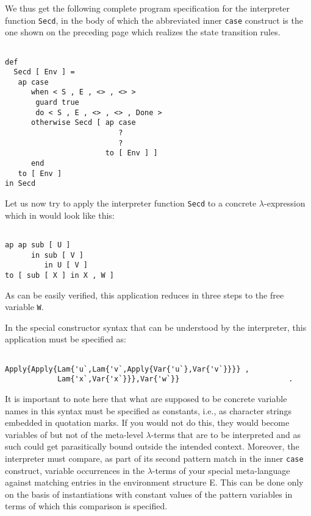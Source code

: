 We thus get the following complete program specification for the
interpreter function  {\tt Secd}, in the body of 
which the abbreviated inner {\tt case} construct is the one
shown on the preceding page which  realizes the state transition rules.
\begin{verbatim}
 
def 
  Secd [ Env ] =
   ap case 
      when < S , E , <> , <> >
       guard true
       do < S , E , <> , <> , Done >
      otherwise Secd [ ap case 
                          ? 
                          ?
                       to [ Env ] ]
      end
   to [ Env ]
in Secd

\end{verbatim}

Let us now try to apply the interpreter function {\tt Secd} to a
concrete $\lambda$-expression which in \kir would look like this:
\begin{verbatim}

ap ap sub [ U ]
      in sub [ V ]
         in U [ V ] 
to [ sub [ X ] in X , W ]

\end{verbatim}
As can be easily verified,
 this application reduces in three steps to the free variable {\tt W}.

In the special constructor syntax that can be understood by the interpreter,
this application must be specified as:
\begin{verbatim}

Apply{Apply{Lam{'u`,Lam{'v`,Apply{Var{'u`},Var{'v`}}}} ,
            Lam{'x`,Var{'x`}}},Var{'w`}}                         .

\end{verbatim}
It is important to note here that what are supposed to be concrete 
variable names in this syntax must be specified as constants, i.e.,
as character strings embedded in quotation marks. If you would not
 do this, they
would become variables of \kir but not of the meta-level $\lambda$-terms that are to be interpreted and as such could get
parasitically bound outside the intended context. Moreover, the interpreter 
must compare, as
part of its second pattern match in the inner {\tt case} construct, 
variable occurrences in the $\lambda$-terms of your special
 meta-language against matching entries in the environment structure
E. This can be done only on the basis of {\mys instantiations} with
constant values of the pattern variables in terms of which this
comparison is specified.

